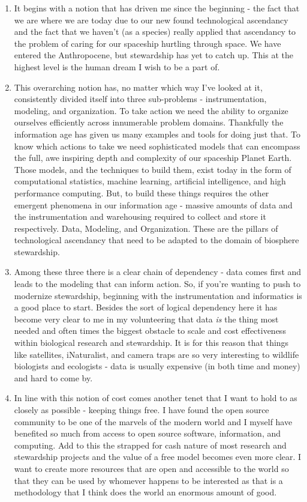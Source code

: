 \documentclass[10pt,a5paper]{book}
\begin{document}
\begin{enumerate}
\item It begins with a notion that has driven me since the beginning - the fact that we are where we are today due to our new found technological ascendancy and the fact that we haven't (as a species) really applied that ascendancy to the problem of caring for our spaceship hurtling through space. We have entered the Anthropocene, but stewardship has yet to catch up. This at the highest level is the human dream I wish to be a part of. 
\item This overarching notion has, no matter which way I've looked at it, consistently divided itself into three sub-problems - instrumentation, modeling, and organization. To take action we need the ability to organize ourselves efficiently across innumerable problem domains. Thankfully the information age has given us many examples and tools for doing just that. To know which actions to take we need sophisticated models that can encompass the full, awe inspiring depth and complexity of our spaceship Planet Earth. Those models, and the techniques to build them, exist today in the form of computational statistics, machine learning, artificial intelligence, and high performance computing. But, to build these things requires the other emergent phenomena in our information age - massive amounts of data and the instrumentation and warehousing required to collect and store it respectively. Data, Modeling, and Organization. These are the pillars of technological ascendancy that need to be adapted to the domain of biosphere stewardship.
\item Among these three there is a clear chain of dependency - data comes first and leads to the modeling that can inform action. So, if you're wanting to push to modernize stewardship, beginning with the instrumentation and informatics is a good place to start. Besides the sort of logical dependency here it has become very clear to me in my volunteering that data \textit{is} the thing most needed and often times the biggest obstacle to scale and cost effectiveness within biological research and stewardship. It is for this reason that things like satellites, iNaturalist, and camera traps are so very interesting to wildlife biologists and ecologists - data is usually expensive (in both time and money) and hard to come by. 
\item In line with this notion of cost comes another tenet that I want to hold to as closely as possible - keeping things free. I have found the open source community to be one of the marvels of the modern world and I myself have benefited so much from access to open source software, information, and computing. Add to this the strapped for cash nature of most research and stewardship projects and the value of a free model becomes even more clear. I want to create more resources that are open and accessible to the world so that they can be used by whomever happens to be interested as that is a methodology that I think does the world an enormous amount of good. 

\end{enumerate}
\end{document}
